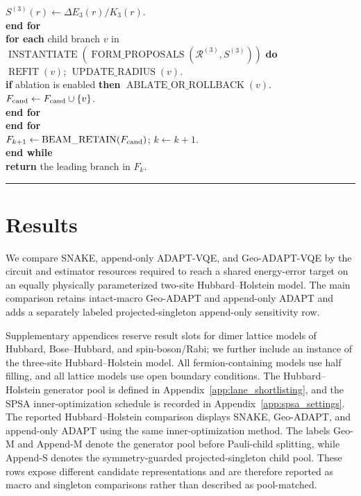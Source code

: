 \documentclass[
  reprint,
  amsmath,
  amssymb,
  aps,
  pra,
  nofootinbib,
  superscriptaddress,
  floatfix
]{revtex4-2}
\begin{document}
\begin{widetext}
\begin{tabbing}
\>\>\>\(S^{(3)}(r)\leftarrow\Delta E_3(r)/K_3(r)\).\\
\>\>\textbf{end for}\\
\>\>\textbf{for each} child branch \(v\) in
\(\operatorname{INSTANTIATE}(\operatorname{FORM\_PROPOSALS}(\mathcal R^{(3)},S^{(3)}))\) \textbf{do}\\
\>\>\>\(\operatorname{REFIT}(v)\); \(\operatorname{UPDATE\_RADIUS}(v)\).\\
\>\>\>\textbf{if} ablation is enabled \textbf{then} \(\operatorname{ABLATE\_OR\_ROLLBACK}(v)\).\\
\>\>\>\(F_{\rm cand}\leftarrow F_{\rm cand}\cup\{v\}\).\\
\>\>\textbf{end for}\\
\>\textbf{end for}\\
\>\(F_{k+1}\leftarrow\operatorname{BEAM\_RETAIN}(F_{\rm cand})\); \(k\leftarrow k+1\).\\
\textbf{end while}\\
\textbf{return} the leading branch in \(F_k\).
\end{tabbing}
\noindent\rule{\textwidth}{0.4pt}
\end{widetext}



\section{Results}
\label{sec:results}
\label{sec:benchmarks}

We compare SNAKE, append-only ADAPT-VQE, and Geo-ADAPT-VQE by the
circuit and estimator resources required to reach a shared energy-error target
on an equally physically parameterized two-site Hubbard--Holstein model.  The
main comparison retains intact-macro Geo-ADAPT and append-only ADAPT and adds a
separately labeled projected-singleton append-only sensitivity row.

Supplementary appendices reserve result slots for dimer lattice models of Hubbard, Bose--Hubbard, and spin-boson/Rabi; we further include an instance of the three-site Hubbard--Holstein model. All fermion-containing models use half filling, and all lattice models use open boundary conditions. The Hubbard--Holstein generator pool is defined in Appendix~\ref{app:lane_shortlisting}, and the SPSA inner-optimization schedule is recorded in Appendix~\ref{app:spsa_settings}. The reported Hubbard--Holstein comparison displays SNAKE, Geo-ADAPT, and append-only ADAPT using the same inner-optimization method. The labels Geo-M and Append-M denote the generator pool before Pauli-child splitting, while Append-S denotes the symmetry-guarded projected-singleton child pool. These rows expose different candidate representations and are therefore reported as macro and singleton comparisons rather than described as pool-matched.
\end{document}
